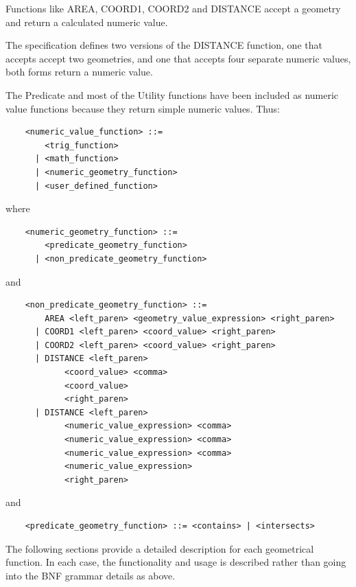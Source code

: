 \documentclass[11pt,a4paper]{ivoa}
\begin{document}
Functions like AREA, COORD1, COORD2 and DISTANCE accept a geometry and
return a calculated numeric value.

The specification defines two versions of the DISTANCE function,
one that accepts accept two geometries, and one that accepts four
separate numeric values, both forms return a numeric value.

The Predicate and most of the Utility functions have been included as numeric
value functions because they return simple numeric values. Thus:

\begin{verbatim}
    <numeric_value_function> ::=
        <trig_function>
      | <math_function>
      | <numeric_geometry_function>
      | <user_defined_function>
\end{verbatim}

where

\begin{verbatim}
    <numeric_geometry_function> ::=
        <predicate_geometry_function>
      | <non_predicate_geometry_function>
\end{verbatim}

and

\begin{verbatim}
    <non_predicate_geometry_function> ::=
        AREA <left_paren> <geometry_value_expression> <right_paren>
      | COORD1 <left_paren> <coord_value> <right_paren>
      | COORD2 <left_paren> <coord_value> <right_paren>
      | DISTANCE <left_paren>
            <coord_value> <comma>
            <coord_value>
            <right_paren>
      | DISTANCE <left_paren>
            <numeric_value_expression> <comma>
            <numeric_value_expression> <comma>
            <numeric_value_expression> <comma>
            <numeric_value_expression>
            <right_paren>
\end{verbatim}

and

\begin{verbatim}
    <predicate_geometry_function> ::= <contains> | <intersects>
\end{verbatim}

\clearpage
\label{sec:geom.functions.definitions}

The following sections provide a detailed description for each geometrical
function. In each case, the functionality and usage is described rather
than going into the BNF grammar details as above.
\end{document}
